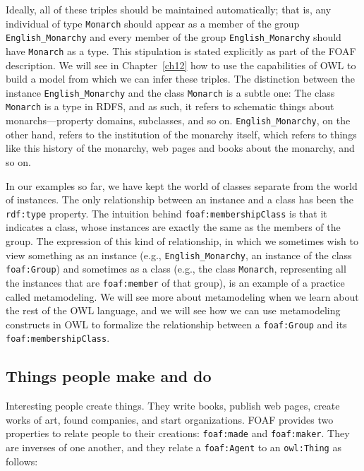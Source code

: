 Ideally, all of these triples should be maintained automatically; that
is, any individual of type \texttt{Monarch} should appear as a member of the
group \texttt{English\_Monarchy} and every member of the group \texttt{English\_Monarchy}
should have \texttt{Monarch} as a type. This stipulation is stated explicitly as
part of the FOAF description. We will see in Chapter~\ref{ch12} how to use the
capabilities of OWL to build a model from which we can infer these
triples. The distinction between the instance \texttt{English\_Monarchy} and the
class \texttt{Monarch} is a subtle one: The class \texttt{Monarch} is a type in RDFS, and
as such, it refers to schematic things about monarchs---property
domains, subclasses, and so on. \texttt{English\_Monarchy}, on the other hand,
refers to the institution of the monarchy itself, which refers to things
like this history of the monarchy, web pages and books about the
monarchy, and so on.

In our examples so far, we have kept the world of classes separate from
the world of instances. The only relationship between an instance and a
class has been the \texttt{rdf:type} property. The intuition behind
\texttt{foaf:membershipClass} is that it indicates a class, whose instances are
exactly the same as the members of the group. The expression of this
kind of relationship, in which we sometimes wish to view something as an
instance (e.g., \texttt{English\_Monarchy}, an instance of the class \texttt{foaf:Group})
and sometimes as a class (e.g., the class \texttt{Monarch}, representing all the
instances that are \texttt{foaf:member} of that group), is an example of a
practice called metamodeling. We will see more about metamodeling when
we learn about the rest of the OWL language, and we will see how we can
use metamodeling constructs in OWL to formalize the relationship between
a \texttt{foaf:Group} and its \texttt{foaf:membershipClass}.

\subsection{Things people make and do}

Interesting people create things. They write books, publish web pages,
create works of art, found companies, and start organizations. FOAF
provides two properties to relate people to their creations: \texttt{foaf:made}
and \texttt{foaf:maker}. They are inverses of one another, and they relate a
\texttt{foaf:Agent} to an \texttt{owl:Thing} as follows:

